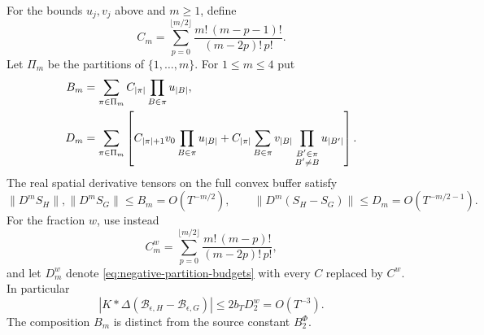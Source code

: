\begin{lemma}
\label{lem:negative-spatial-jets}
For the bounds $u_j,v_j$ above and $m\ge1$, define
\begin{equation}
 C_m=\sum_{p=0}^{\lfloor m/2\rfloor}
 \frac{m!\,(m-p-1)!}{(m-2p)!\,p!}.
 \label{eq:negative-composition-constants}
\end{equation}
Let $\Pi_m$ be the partitions of $\{1,\ldots,m\}$. For $1\le m\le4$ put
\begin{align}
 B_m&=\sum_{\pi\in\Pi_m}C_{|\pi|}
                      \prod_{B\in\pi}u_{|B|},\notag\\
 D_m&=\sum_{\pi\in\Pi_m}\left[
 C_{|\pi|+1}v_0\prod_{B\in\pi}u_{|B|}
 +C_{|\pi|}\sum_{B\in\pi}v_{|B|}
                \prod_{\substack{B'\in\pi\\B'\ne B}}u_{|B'|}
 \right].
 \label{eq:negative-partition-budgets}
\end{align}
The real spatial derivative tensors on the full convex buffer satisfy
\begin{equation}
 \|D^mS_H\|,\|D^mS_G\|\le B_m=O(T^{-m/2}),\qquad
 \|D^m(S_H-S_G)\|\le D_m=O(T^{-m/2-1}).
 \label{eq:negative-spatial-jets}
\end{equation}
For the fraction $w$, use instead
\begin{equation}
 C_m^w=\sum_{p=0}^{\lfloor m/2\rfloor}
 \frac{m!\,(m-p)!}{(m-2p)!\,p!},
 \label{eq:negative-w-constants}
\end{equation}
and let $D_m^w$ denote \eqref{eq:negative-partition-budgets} with every
$C$ replaced by $C^w$. In particular
\begin{equation}
 |K*\Delta(\mathcal B_{\epsilon,H}-\mathcal B_{\epsilon,G})|
 \le2b_TD_2^w=O(T^{-3}).
 \label{eq:negative-forcing-laplacian}
\end{equation}
The composition $B_m$ is distinct from the source constant $B_2^{\Phi}$.
\end{lemma}
